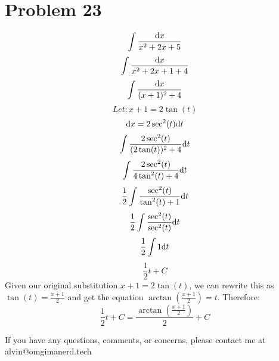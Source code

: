 \documentclass[letterpaper, 12pt]{math}
\begin{document}
\section*{Problem 23}
\[ \int{\frac{\mathrm{d}{x}}{x^{2}+2x+5}} \]
\[ \int{\frac{\mathrm{d}{x}}{x^{2}+2x+1+4}} \]
\[ \int{\frac{\mathrm{d}{x}}{(x+1)^{2}+4}} \]
\[ Let: x+1 = 2\tan(t) \]
\[ \mathrm{d}{x} = 2\sec^{2}(t)\mathrm{d}{t} \]
\[ \int{\frac{2\sec^{2}(t)}{(2\tan(t))^{2}+4}\mathrm{d}{t}} \]
\[ \int{\frac{2\sec^{2}(t)}{4\tan^{2}(t)+4}\mathrm{d}{t}} \]
\[ \frac{1}{2}\int{\frac{\sec^{2}(t)}{\tan^{2}(t)+1}\mathrm{d}{t}} \]
\[ \frac{1}{2}\int{\frac{\sec^{2}(t)}{\sec^{2}(t)}\mathrm{d}{t}} \]
\[ \frac{1}{2}\int{1\mathrm{d}{t}} \]
\[ \frac{1}{2}t+C \]
Given our original substitution \( x+1 = 2\tan(t) \), we can rewrite this as
\( \tan(t) = \frac{x+1}{2} \) and get the equation
\( \arctan(\frac{x+1}{2}) = t \).
Therefore:
\[ \frac{1}{2}t+C = \frac{\arctan(\frac{x+1}{2})}{2}+C \]

\begin{center}
  If you have any questions, comments, or concerns, please contact me at
  alvin@omgimanerd.tech
\end{center}
\end{document}
